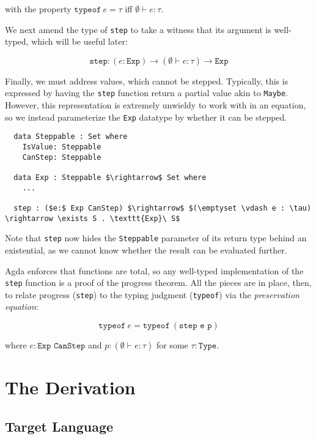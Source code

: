 \documentclass[manuscript,screen,review,sigplan]{acmart}
\begin{document}
with the property $\texttt{typeof}\ e = \tau$ iff $\emptyset \vdash e : \tau$.

We next amend the type of \texttt{step} to take a witness that its argument
is well-typed, which will be useful later:

\begin{equation}
  \texttt{step} : (e: \texttt{Exp}) \rightarrow (\emptyset \vdash e : \tau)
    \rightarrow \texttt{Exp}
\end{equation}

Finally, we must address values, which cannot be stepped. Typically, this is
expressed by having the \texttt{step} function return a partial value akin to
\texttt{Maybe}. However, this representation is extremely unwieldy to work with
in an equation, so we instead parameterize the \texttt{Exp} datatype by whether
it can be stepped.

\begin{lstlisting}
  data Steppable : Set where
    IsValue: Steppable
    CanStep: Steppable

  data Exp : Steppable $\rightarrow$ Set where
    ...

  step : ($e:$ Exp CanStep) $\rightarrow$ $(\emptyset \vdash e : \tau) \rightarrow \exists S . \texttt{Exp}\ S$
\end{lstlisting}

Note that \texttt{step} now hides the \texttt{Steppable} parameter of its
return type behind an existential, as we cannot know whether the result can be
evaluated further.

Agda enforces that functions are total, so any well-typed implementation of the
\texttt{step} function is a proof of the progress theorem. All the pieces are
in place, then, to relate progress (\texttt{step}) to the typing judgment
(\texttt{typeof}) via the \emph{preservation equation}:

\begin{equation}
  \texttt{typeof}\ e = \texttt{typeof}\ (\texttt{step e p})
\end{equation}

where $e : \texttt{Exp CanStep}$ and $p : (\emptyset \vdash e : \tau)$ for some
$\tau : \texttt{Type}$.

\section{The Derivation}

\subsection{Target Language}



\end{document}

